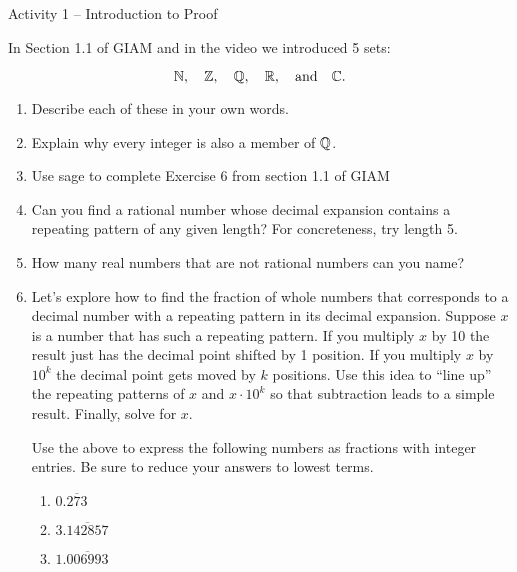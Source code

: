 \documentclass{amsart}
\begin{document}
\thispagestyle{empty}

\centerline{\Large Activity 1 -- Introduction to Proof}
\bigskip
\Large

In Section 1.1 of GIAM and in the video we introduced 5 sets:

\[ {\mathbb N}, \quad {\mathbb Z}, \quad {\mathbb Q}, \quad {\mathbb R}, \quad \mbox{and} \quad {\mathbb C}. \]

\begin{enumerate}
\item Describe each of these in your own words.

\vfill

\item Explain why every integer is also a member of ${\mathbb Q}$.

\vfill

\newpage

\item Use sage to complete Exercise 6 from section 1.1 of GIAM

\vfill

\item Can you find a rational number whose decimal expansion contains a repeating pattern of any given length?  For concreteness, try length 5.

\vfill

\newpage

\item How many real numbers that are not rational numbers can you name?

\vfill

\item Let's explore how to find the fraction of whole numbers that corresponds to a decimal number with a repeating pattern in its decimal expansion.
Suppose $x$ is a number that has such a repeating pattern.  If you multiply $x$ by 10 the result just has the decimal point shifted by 1 position.  If you multiply $x$ by $10^k$ the decimal point gets moved by $k$ positions.  Use this idea to ``line up'' the repeating patterns of $x$ and $x \cdot 10^k$ so that subtraction leads to a simple result.  Finally, solve for $x$.

Use the above to express the following numbers as fractions with integer entries.  Be sure to reduce your answers to lowest terms.

\begin{enumerate}
\item \rule{0pt}{36pt} $0.\overline{273}$ 
\item \rule{0pt}{36pt} $3.\overline{142857}$ 
\item \rule{0pt}{36pt} $1.\overline{006993}$ 
\end{enumerate}


\end{enumerate}
\end{document}
